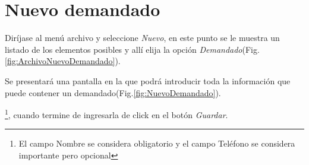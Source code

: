 \section{Nuevo demandado}
\label{sec:nuevoDemandado}
Dir\'ijase al men\'u archivo y seleccione \emph{Nuevo}, en este punto se le muestra un listado de los elementos posibles y
all\'i elija la opci\'on \emph{Demandado}(Fig.\ref{fig:ArchivoNuevoDemandado}). 
  

Se presentar\'a una pantalla en la que podr\'a introducir toda la informaci\'on
que puede contener un demandado(Fig.\ref{fig:NuevoDemandado}). 
  
\footnote{El campo Nombre se considera obligatorio y el campo Tel\'efono se
considera importante pero opcional},
cuando termine de ingresarla de click en el bot\'on \emph{Guardar}.
